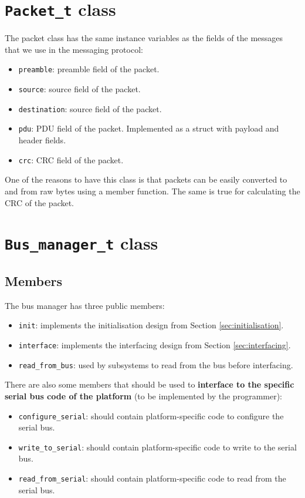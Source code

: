 \section{\texttt{Packet\_t} class}
The packet class has the same instance variables as the fields of the messages that we use in the messaging protocol:
\begin{itemize}
	\item \texttt{preamble}: preamble field of the packet.
	\item \texttt{source}: source field of the packet.
	\item \texttt{destination}: source field of the packet.
	\item \texttt{pdu}: PDU field of the packet. Implemented as a struct with payload and header fields.
	\item \texttt{crc}: CRC field of the packet.
\end{itemize}
One of the reasons to have this class is that packets can be easily converted to and from raw bytes using a member function. The same is true for calculating the CRC of the packet.

\section{\texttt{Bus\_manager\_t} class}
\subsection{Members}
The bus manager has three public members:
\begin{itemize}
	\item \texttt{init}: implements the initialisation design from Section \ref{sec:initialisation}.
	\item \texttt{interface}: implements the interfacing design from Section \ref{sec:interfacing}.
	\item \texttt{read\_from\_bus}: used by subsystems to read from the bus before interfacing.
\end{itemize}
There are also some members that should be used to \textbf{interface to the specific serial bus code of the platform} (to be implemented by the programmer):
\begin{itemize}
	\item \texttt{configure\_serial}: should contain platform-specific code to configure the serial bus.
	\item \texttt{write\_to\_serial}: should contain platform-specific code to write to the serial bus.
	\item \texttt{read\_from\_serial}: should contain platform-specific code to read from the serial bus.
\end{itemize}

